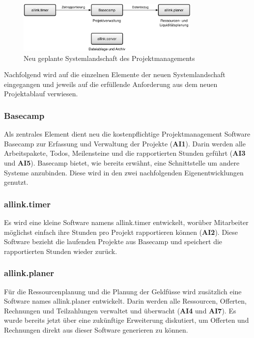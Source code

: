 \begin{figure}[htbp]
\begin{center}
\includegraphics[width=0.8\textwidth,angle=0]{./bilder/loesung/04_systemlandschaft.pdf}
\caption[Neu geplante Systemlandschaft des Projektmanagements]{Neu geplante 
    Systemlandschaft des Projektmanagements\footnotemark}
\label{pic:04_systemlandschaft}
\end{center}
\end{figure}

Nachfolgend wird auf die einzelnen Elemente der neuen Systemlandschaft
eingegangen und jeweils auf die erfüllende Anforderung aus dem neuen Projektablauf
verwiesen.

\subsubsection{Basecamp}
Als zentrales Element dient neu die kostenpflichtige Projektmanagement Software 
Basecamp zur Erfassung und Verwaltung der Projekte (\textbf{AI1}). Darin werden alle
Arbeitspakete, Todos, Meilensteine und die rapportierten Stunden geführt (\textbf{AI3} 
und \textbf{AI5}). Basecamp bietet, wie bereits erwähnt, eine Schnittstelle um
andere Systeme anzubinden. Diese wird in den zwei nachfolgenden Eigenentwicklungen
genutzt.

\subsubsection{allink.timer}
Es wird eine kleine Software namens allink.timer entwickelt, worüber Mitarbeiter 
möglichst einfach ihre Stunden pro Projekt rapportieren können (\textbf{AI2}). 
Diese Software bezieht die laufenden Projekte aus Basecamp und speichert die 
rapportierten Stunden wieder zurück.

\subsubsection{allink.planer}
Für die Ressourcenplanung und die Planung der Geldfüsse wird zusätzlich eine 
Software names allink.planer entwickelt. Darin werden alle Ressourcen, Offerten, 
Rechnungen und Teilzahlungen verwaltet und überwacht (\textbf{AI4} und \textbf{AI7}).
Es wurde bereits jetzt über eine zukünftige Erweiterung diskutiert, um 
Offerten und Rechnungen direkt aus dieser Software generieren zu können.

